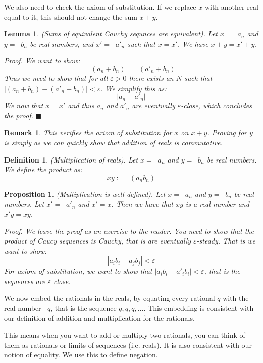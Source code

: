 \documentclass{article}
\newtheorem{definition}{Definition}[subsection]
\newtheorem{remark}{Remark}[subsection]
\newtheorem{proposition}{Proposition}[subsection]
\newtheorem{lemma}{Lemma}[subsection]
\newcommand{\vep}{\varepsilon} %
\DeclareMathOperator{\infLIM}{\mathrm{LIM}_{n \to \infty}}
\let\it\textit
\begin{document}
We also need to check the axiom of substitution. If we replace 
$x$ with another real equal to it, this should not change
the sum $x+y$.

\begin{lemma}
	(Sums of equivalent Cauchy sequnces are equivalent). 
	Let $x = \infLIM a_n$ and $y = \infLIM b_n$ be real numbers,
	and $x' = \infLIM a'_n$ such that $x = x'$. We have
	$x + y = x' + y$.

	\it{Proof}. We want to show:
	$$
	\infLIM (a_n + b_n) = \infLIM (a'_n + b_n)
	$$
	Thus we need to show that for all $\vep > 0$ there exists
	an $N$ such that $|(a_n + b_n) - (a'_n + b_n)| < \vep$.
	We simplify this as: 
	$$
	|a_n - a'_n|
	$$
	We now that $x = x'$ and thus $a_n$ and $a'_n$ are 
	eventually $\vep$-close, which concludes the proof.
	\hfill $\blacksquare$
\end{lemma}

\begin{remark}
	This verifies the axiom of substitution for $x$ on
	$x + y$. Proving for $y$ is simply as we can quickly
	show that addition of reals is commutative.
\end{remark}

\begin{definition}
	(Multiplication of reals). Let $x = \infLIM a_n$ and
	$y = \infLIM b_n$ be real numbers. We define the
	product as:
	$$
	xy := \infLIM (a_n b_n)
	$$
\end{definition}

\begin{proposition}
	(Multiplication is well defined). Let $x = \infLIM a_n$ and	
	$y = \infLIM b_n$ be real numbers. Let 
	$x' = \infLIM a'_n$ and $x' =x$. Then we have
	that $xy$ is a real number and $x'y=xy$.

	\it{Proof}. We leave the proof as an exercise to the reader. 
	You need to show that the product of Caucy sequences is
	Cauchy, that is are eventually $\vep$-steady. 
	That is we want to show:
	$$
	|a_i b_i - a_j b_j| < \vep
	$$
	For axiom of substitution, we want to show 
	that $|a_i b_i - a'_i b_i| < \vep$, that 
	is the sequences are $\vep$ close.
\end{proposition}

We now embed the rationals in the reals, by equating 
every rational $q$ with the real number 
$\infLIM q$, that is the sequence $q, q, q, \dots$.
This embedding is consistent with our definition of 
addition and multiplication for the rationals.

This means when you want to add or multiply two
rationals, you can think of them as rationals 
or limits of sequences (i.e. reals). It
is also consistent with our notion of equality.
We use this to define negation.
\end{document}
